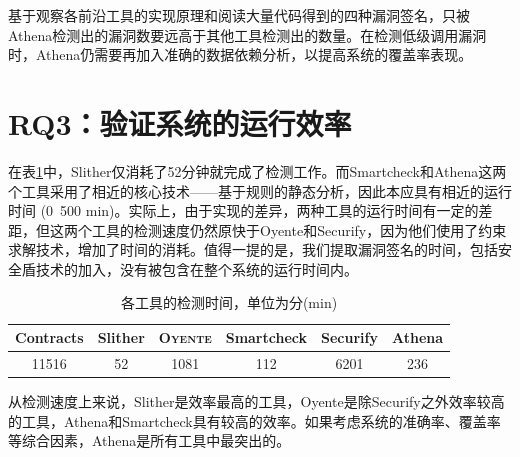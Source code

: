 基于观察各前沿工具的实现原理和阅读大量代码得到的四种漏洞签名，只被Athena检测出的漏洞数要远高于其他工具检测出的数量。在检测低级调用漏洞时，Athena仍需要再加入准确的数据依赖分析，以提高系统的覆盖率表现。

\section{RQ3：验证系统的运行效率}

在表\ref{tab:time_cost}中，Slither仅消耗了52分钟就完成了检测工作。而Smartcheck和Athena这两个工具采用了相近的核心技术——基于规则的静态分析，因此本应具有相近的运行时间 (0~500 min)。实际上，由于实现的差异，两种工具的运行时间有一定的差距，但这两个工具的检测速度仍然原快于Oyente和Securify，因为他们使用了约束求解技术，增加了时间的消耗。值得一提的是，我们提取漏洞签名的时间，包括安全盾技术的加入，没有被包含在整个系统的运行时间内。

\begin{table}
  \centering
  \caption{各工具的检测时间，单位为分(min)}
  \begin{tabular}{cccccc}
    \toprule
    Contracts & Slither & \textsc{Oyente} & Smartcheck & Securify & Athena \\
    \midrule
    11516 & 52 & 1081 & 112 & 6201 & 236 \\
    \bottomrule
  \end{tabular}
  \label{tab:time_cost}
\end{table}

从检测速度上来说，Slither是效率最高的工具，Oyente是除Securify之外效率较高的工具，Athena和Smartcheck具有较高的效率。如果考虑系统的准确率、覆盖率等综合因素，Athena是所有工具中最突出的。